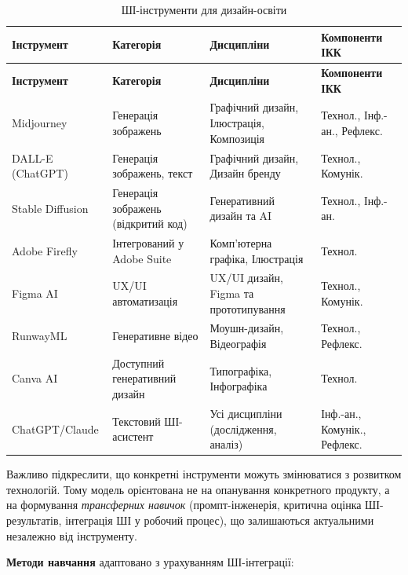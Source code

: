 \begin{longtable}{@{}p{}p{}p{}p{}@{}}
\caption{ШІ-інструменти для дизайн-освіти}\label{tab:ai-tools} \\
\hline
\textbf{Інструмент} & \textbf{Категорія} & \textbf{Дисципліни} & \textbf{Компоненти ІКК} \\
\hline
\endfirsthead
\hline
\textbf{Інструмент} & \textbf{Категорія} & \textbf{Дисципліни} & \textbf{Компоненти ІКК} \\
\hline
\endhead
Midjourney & Генерація зображень & Графічний дизайн, Ілюстрація, Композиція & Технол., Інф.-ан., Рефлекс. \\
\addlinespace
DALL-E (ChatGPT) & Генерація зображень, текст & Графічний дизайн, Дизайн бренду & Технол., Комунік. \\
\addlinespace
Stable Diffusion & Генерація зображень (відкритий код) & Генеративний дизайн та AI & Технол., Інф.-ан. \\
\addlinespace
Adobe Firefly & Інтегрований у Adobe Suite & Комп'ютерна графіка, Ілюстрація & Технол. \\
\addlinespace
Figma AI & UX/UI автоматизація & UX/UI дизайн, Figma та прототипування & Технол., Комунік. \\
\addlinespace
RunwayML & Генеративне відео & Моушн-дизайн, Відеографія & Технол., Рефлекс. \\
\addlinespace
Canva AI & Доступний генеративний дизайн & Типографіка, Інфографіка & Технол. \\
\addlinespace
ChatGPT/Claude & Текстовий ШІ-асистент & Усі дисципліни (дослідження, аналіз) & Інф.-ан., Комунік., Рефлекс. \\
\hline
\end{longtable}

Важливо підкреслити, що конкретні інструменти можуть змінюватися з розвитком технологій. Тому модель орієнтована не на опанування конкретного продукту, а на формування \textit{трансферних навичок} (промпт-інженерія, критична оцінка ШІ-результатів, інтеграція ШІ у робочий процес), що залишаються актуальними незалежно від інструменту.

\textbf{Методи навчання} адаптовано з урахуванням ШІ-інтеграції:

